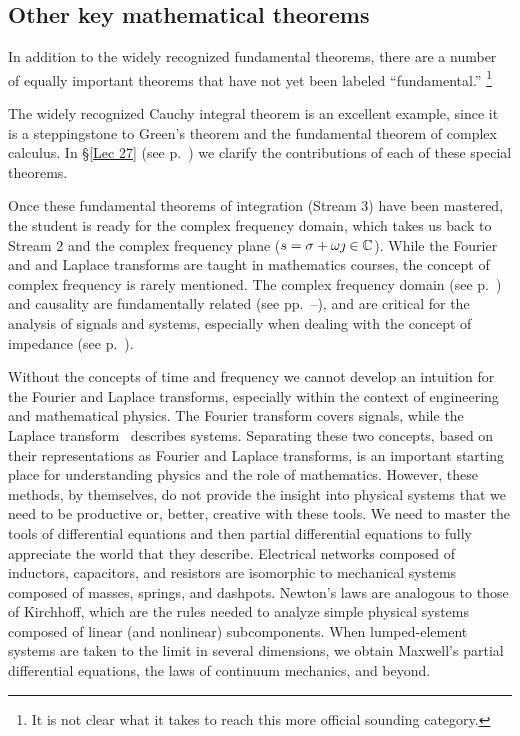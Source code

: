 \documentclass{ximera}
\begin{document}
\subsection {Other key mathematical theorems}
In addition to the widely recognized fundamental theorems,
there are a number of equally important theorems that have not yet been labeled ``fundamental.''%
 \footnote{It is not clear what it takes to reach this more official sounding category.}

The widely recognized Cauchy integral theorem is an excellent example, since it is a steppingstone
to Green's theorem and the fundamental theorem of complex calculus.
In \S \ref{Lec 27} (see p.~\pageref{Lec 27})		 %
we clarify the contributions of each of these special theorems.  

Once these fundamental theorems of integration (Stream 3) have been mastered, the student is ready
for the complex frequency domain, which takes us back to Stream 2 and the
complex frequency plane ($s= \sigma+\omega\jmath \in \mathbb{C}$). 
While the Fourier and and Laplace transforms are taught in mathematics courses, the concept of complex
frequency is rarely mentioned.
The complex frequency domain (see p.~\pageref{LaplaceFrequency}) and causality are
fundamentally related (see pp.~\pageref{Lec 28}--\pageref{Lec 30}),
and are critical for the analysis of signals and systems, especially when dealing with the concept
of impedance (see p.~\pageref{Lec 25}).

Without the concepts of time and frequency we cannot develop an intuition for the Fourier and Laplace
transforms, especially within the context of engineering and mathematical physics.
The Fourier transform covers signals, while the Laplace transform \LT\ describes systems. Separating these
two concepts, based on their representations as Fourier and Laplace transforms, is an important
starting place for understanding physics and the role of mathematics. However, these methods, by
themselves, do not provide the insight into physical systems that we need to be productive or, better,
creative with these tools. We need to master the tools of differential equations and then partial
differential equations to fully appreciate the world that they describe. Electrical 
networks composed of inductors, capacitors, and resistors are isomorphic to mechanical systems
composed of masses, springs, and dashpots. Newton's laws are analogous to those of Kirchhoff,
which are the rules needed to analyze simple physical systems composed of linear (and nonlinear)
subcomponents. When lumped-element systems are taken to the limit in several dimensions, we obtain
Maxwell's partial differential equations, the laws of continuum mechanics, and beyond.
\end{document}
